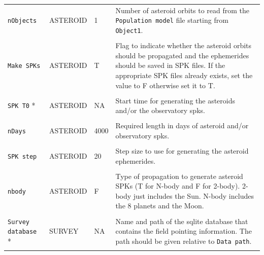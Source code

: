 \documentclass[10pt,a4paper]{article}
\begin{document}
\begin{longtable}{l l p{20mm} p{50mm}}
    \verb+nObjects+           & ASTEROID      & 1             & Number of asteroid orbits to read from the \verb+Population model+ file
                                                               starting from \verb+Object1+. \\ \\

    \verb+Make SPKs+          & ASTEROID      & T             & Flag to indicate whether the asteroid orbits should be propagated 
                                                               and the ephemerides should be saved in SPK files.
                                                               If the appropriate SPK files already exists, set the value to F 
                                                               otherwise set it to T. \\ \\

    \verb+SPK T0+ *           & ASTEROID      & NA            & Start time for generating the asteroids and/or the observatory spks. \\ \\

    \verb+nDays+              & ASTEROID      & 4000          & Required length in days of asteroid and/or observatory spks. \\ \\

    \verb+SPK step+           & ASTEROID      & 20            & Step size to use for generating the asteroid ephemerides. \\ \\

    \verb+nbody+              & ASTEROID      & F             & Type of propagation to generate asteroid SPKs (T for N-body and F for 2-body).
                                                               2-body just includes the Sun. N-body includes the 8 planets and the Moon. \\ \\
    
    \verb+Survey database+ *  & SURVEY        & NA            & Name and path of the sqlite database that contains 
                                                               the field pointing information. The path should be given 
                                                               relative to \verb+Data path+. \\ \\

                                                                      

\end{longtable}
\end{document}
